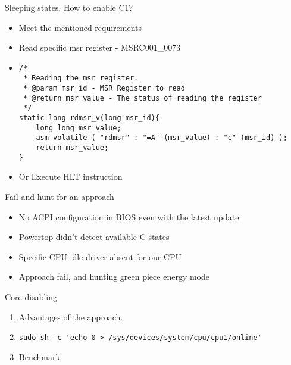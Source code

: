 \begin{frame}[fragile]
	{Sleeping states. How to enable C1?}
	\begin{itemize}
		\item	Meet the mentioned requirements
		\item	Read specific msr register - {\color{red}MSRC001\_0073}            
		\item[]	\begin{lstlisting}
/*
 * Reading the msr register.
 * @param msr_id - MSR Register to read
 * @return msr_value - The status of reading the register
 */
static long rdmsr_v(long msr_id){		
    long long msr_value;
    asm volatile ( "rdmsr" : "=A" (msr_value) : "c" (msr_id) );
    return msr_value;		
}
\end{lstlisting}
		\item	Or Execute {\color{red}HLT} instruction
	\end{itemize}
\end{frame}


\begin{frame}[fragile]{Fail and hunt for an approach}
	\begin{itemize}
		\item No ACPI configuration in BIOS even with the latest update
		\item Powertop didn't detect available C-states
		\item Specific CPU idle driver absent for our CPU
		\item Approach fail, and hunting green piece energy mode
	\end{itemize}
\end{frame}

\begin{frame}[fragile]{Core disabling}
	\begin{enumerate}
		\item Advantages of the approach. 
		\item[] \lstinline$sudo sh -c 'echo 0 > /sys/devices/system/cpu/cpu1/online'$
		\item Benchmark
	\end{enumerate}
\end{frame}

